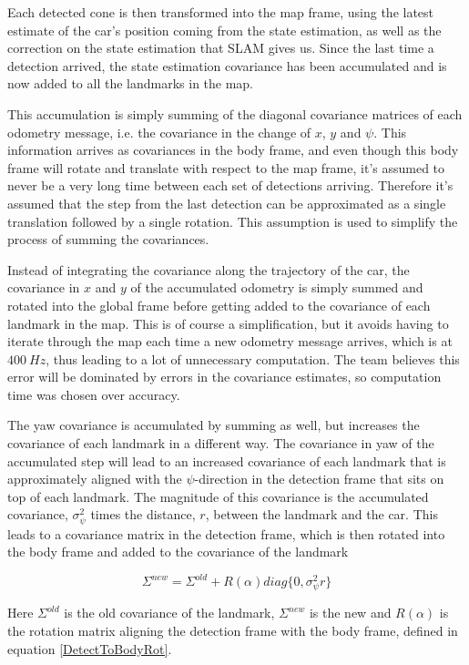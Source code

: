 Each detected cone is then transformed into the map frame, using the latest estimate of the car's position coming from the state estimation, as well as the correction on the state estimation that \gls{SLAM} gives us. Since the last time a detection arrived, the state estimation covariance has been accumulated and is now added to all the landmarks in the map. 

This accumulation is simply summing of the diagonal covariance matrices of each odometry message, i.e. the covariance in the change of $x$, $y$ and $\psi$. This information arrives as covariances in the body frame, and even though this body frame will rotate and translate with respect to the map frame, it's assumed to never be a very long time between each set of detections arriving. Therefore it's assumed that the step from the last detection can be approximated as a single translation followed by a single rotation. This assumption is used to simplify the process of summing the covariances. 

Instead of integrating the covariance along the trajectory of the car, the covariance in $x$ and $y$ of the accumulated odometry is simply summed and rotated into the global frame before getting added to the covariance of each landmark in the map. This is of course a simplification, but it avoids having to iterate through the map each time a new odometry message arrives, which is at $\SI{400}{Hz}$, thus leading to a lot of unnecessary computation. The team believes this error will be dominated by errors in the covariance estimates, so computation time was chosen over accuracy. 

The yaw covariance is accumulated by summing as well, but increases the covariance of each landmark in a different way. The covariance in yaw of the accumulated step will lead to an increased covariance of each landmark that is approximately aligned with the $\psi$-direction in the detection frame that sits on top of each landmark. The magnitude of this covariance is the accumulated covariance, $\sigma_{\psi}^2$ times the distance, $r$, between the landmark and the car. This leads to a covariance matrix in the detection frame, which is then rotated into the body frame and added to the covariance of the landmark

\begin{equation}
    \Sigma^{new} = \Sigma^{old} + R(\alpha)diag\{0,\sigma^2_{\psi}r\}
\end{equation}

Here $\Sigma^{old}$ is the old covariance of the landmark, $\Sigma^{new}$ is the new and $R(\alpha)$ is the rotation matrix aligning the detection frame with the body frame, defined in equation \ref{DetectToBodyRot}. 

